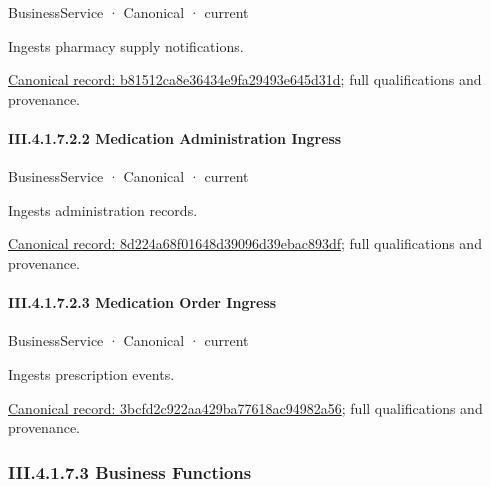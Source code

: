 \label{element:b81512ca8e36434e9fa29493e645d31d}
{\small BusinessService · Canonical · current}\par

Ingests pharmacy supply notifications.


{\footnotesize \href{../../../../continuum/business/business-service/b81512ca8e36434e9fa29493e645d31d.md}{Canonical record: b81512ca8e36434e9fa29493e645d31d}; full qualifications and provenance.}\par
\paragraph*{III.4.1.7.2.2 Medication Administration Ingress}
\label{navigation:III.4.1.7.2.2}

\label{element:8d224a68f01648d39096d39ebac893df}
{\small BusinessService · Canonical · current}\par

Ingests administration records.


{\footnotesize \href{../../../../continuum/business/business-service/8d224a68f01648d39096d39ebac893df.md}{Canonical record: 8d224a68f01648d39096d39ebac893df}; full qualifications and provenance.}\par
\paragraph*{III.4.1.7.2.3 Medication Order Ingress}
\label{navigation:III.4.1.7.2.3}

\label{element:3bcfd2c922aa429ba77618ac94982a56}
{\small BusinessService · Canonical · current}\par

Ingests prescription events.


{\footnotesize \href{../../../../continuum/business/business-service/3bcfd2c922aa429ba77618ac94982a56.md}{Canonical record: 3bcfd2c922aa429ba77618ac94982a56}; full qualifications and provenance.}\par
\subsubsection*{III.4.1.7.3 Business Functions}
\label{navigation:III.4.1.7.3}

